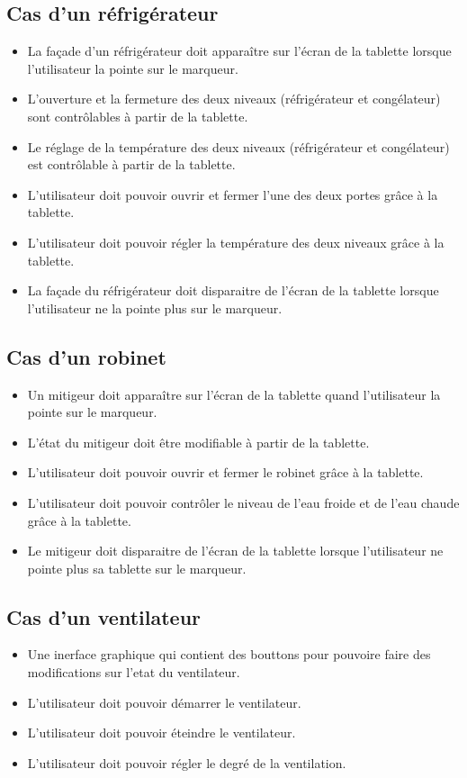 \documentclass[12pt,a4paper]{article}
\begin{document}
\subsection{Cas d'un réfrigérateur}
\begin{itemize} 
 \item La façade d'un réfrigérateur doit apparaître sur l'écran de la tablette lorsque l'utilisateur la pointe sur le marqueur.
 \item L'ouverture et la fermeture des deux niveaux (réfrigérateur et congélateur) sont contrôlables à partir de la tablette.
 \item Le réglage de la température des deux niveaux (réfrigérateur et congélateur) est contrôlable à partir de la tablette.
 \item L'utilisateur doit pouvoir ouvrir et fermer l'une des deux portes grâce à la tablette.
 \item L'utilisateur doit pouvoir régler la température des deux niveaux grâce à la tablette.
 \item La façade du réfrigérateur doit disparaitre de l'écran de la tablette lorsque l'utilisateur ne la pointe plus sur le marqueur.
\end{itemize}

\subsection{Cas d'un robinet}
\begin{itemize} 
  \item Un mitigeur doit apparaître sur l'écran de la tablette quand l'utilisateur la pointe sur le marqueur.
  \item L'état du mitigeur doit être modifiable à partir de la tablette.
  \item L'utilisateur doit pouvoir ouvrir et fermer le robinet grâce à la tablette.
  \item L'utilisateur doit pouvoir contrôler le niveau de l'eau froide et de l'eau chaude grâce à la tablette.
  \item Le mitigeur doit disparaitre de l'écran de la tablette lorsque l'utilisateur ne pointe plus sa tablette sur le marqueur.
\end{itemize}

\subsection{Cas d'un ventilateur}
\begin{itemize} 
  \item Une inerface graphique qui contient des bouttons pour pouvoire faire des modifications sur l'etat du ventilateur.
  \item L’utilisateur doit pouvoir démarrer le ventilateur. 
  \item L’utilisateur doit pouvoir éteindre le ventilateur.
  \item L’utilisateur doit pouvoir régler le degré de la ventilation.
\end{itemize}
\end{document}
